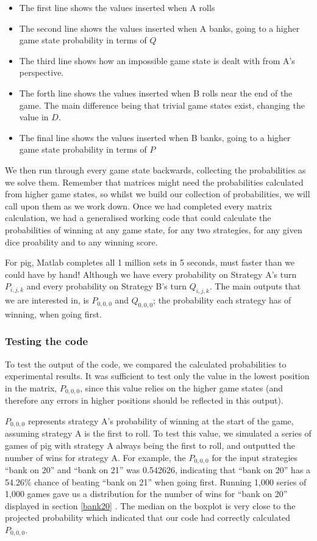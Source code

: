 \documentclass[a4paper,titlepage]{article}
\begin{document}
\begin{itemize}
	\item The first line shows the values inserted when A rolls
	\item The second line shows the values inserted when A banks, going to a higher game state probability in terms of $Q$
	\item The third line shows how an impossible game state is dealt with from A's perspective.
	\item The forth line shows the values inserted when B rolls near the end of the game. The main difference being that trivial game states exist, changing the value in $D$.
	\item The final line shows the values inserted when B banks, going to a higher game state probability in terms of $P$

\end{itemize}

We then run through every game state backwards, collecting the probabilities as we solve them. Remember that matrices might need the probabilities calculated from higher game states, so whilst we build our collection of probabilities, we will call upon them as we work down. Once we had completed every matrix calculation, we had a generalised working code that could calculate the probabilities of winning at any game state, for any two strategies, for any given dice proability and to any winning score.

For pig, Matlab completes all 1 million sets in 5 seconds, must faster than we could have by hand! Although we have every probability on Strategy A's turn $P_{i,j,k}$ and every probability on Strategy B's turn $Q_{i,j,k}$. The main outputs that we are interested in, is $P_{0,0,0}$ and $Q_{0,0,0}$; the probability each strategy has of winning, when going first.

\subsubsection{Testing the code}


To test the output of the code, we compared the calculated probabilities to experimental results. It was sufficient to test only the value in the lowest position in the matrix, $P_{0,0,0}$, since this value relies on the higher game states (and therefore any errors in higher positions should be reflected in this output).

$P_{0,0,0}$ represents strategy A's probability of winning at the start of the game, assuming strategy A is the first to roll. To test this value, we simulated a series of games of pig with strategy A always being the first to roll, and outputted the number of wins for strategy A. For example, the $P_{0,0,0}$ for the input strategies ``bank on 20'' and ``bank on 21'' was 0.542626, indicating that ``bank on 20'' has a 54.26\% chance of beating ``bank on 21'' when going first. Running 1,000 series of 1,000 games gave us a distribution for the number of wins for ``bank on 20'' displayed in section \ref{bank20}
. The median on the boxplot is very close to the projected probability which indicated that our code had correctly calculated $P_{0,0,0}$.
\end{document}
